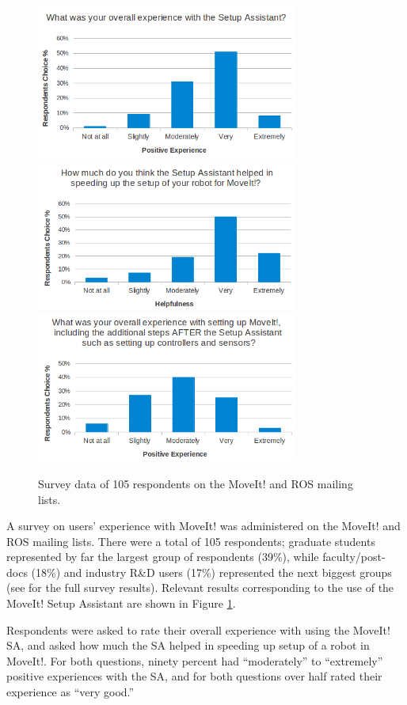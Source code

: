 \documentclass[10pt,journal,compsoc]{joser1}
\begin{document}
{\begin{figure}[!t]
\centering
\includegraphics[width=3.4in]{coleman_20131110_f14}
\includegraphics[width=3.4in]{coleman_20131110_f15}
\includegraphics[width=3.4in]{coleman_20131110_f16}
\caption{Survey data of 105 respondents on the MoveIt! and ROS mailing lists.}
\label{fig:setup_assistant_positive}
\end{figure} 

A survey on users' experience with MoveIt! was administered on the MoveIt! and ROS mailing lists. There were a total of 105 respondents; graduate students represented by far the largest group of respondents (39\%), while faculty/post-docs (18\%) and industry R\&D users (17\%) represented the next biggest groups (see \cite{moveit} for the full survey results). Relevant results corresponding to the use of the MoveIt! Setup Assistant are shown in Figure \ref{fig:setup_assistant_positive}. 

Respondents were asked to rate their overall experience with using the MoveIt! SA, and asked how much the SA helped in speeding up setup of a robot in MoveIt!. For both questions, ninety percent had ``moderately'' to ``extremely'' positive experiences with the SA, and for both questions over half rated their experience as ``very good.''

}
\end{document}
